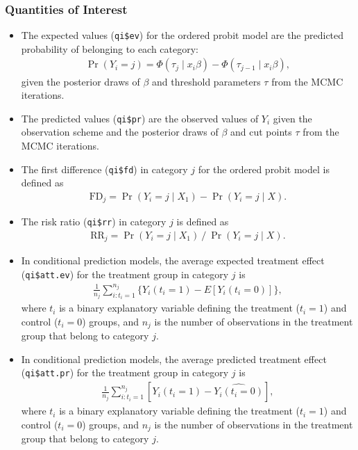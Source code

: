 \subsubsection{Quantities of Interest}

\begin{itemize}
\item The expected values (\texttt{qi\$ev}) for the ordered probit model are
the predicted probability of belonging to each category:
\begin{eqnarray*}
\Pr(Y_i=j)= \Phi(\tau_j \mid x_i \beta)-\Phi(\tau_{j-1} \mid x_i \beta),
\end{eqnarray*}
given the posterior draws of $\beta$ and threshold parameters $\tau$
from the MCMC iterations.

\item The predicted values (\texttt{qi\$pr}) are the observed values of 
$Y_i$ given the observation scheme and the posterior draws of $\beta$
and cut points $\tau$ from the MCMC iterations.

\item The first difference (\texttt{qi\$fd}) in category $j$ for the 
ordered probit model is defined as
\begin{eqnarray*}
\text{FD}_j=\Pr(Y_i=j\mid X_{1})-\Pr(Y_i=j\mid X).
\end{eqnarray*}

\item The risk ratio (\texttt{qi\$rr}) in category $j$ is defined as
\begin{eqnarray*}
\text{RR}_j=\Pr(Y_i=j\mid X_{1})\ /\ \Pr(Y_i=j\mid X).
\end{eqnarray*}


\item In conditional prediction models, the average expected treatment effect
(\texttt{qi\$att.ev}) for the treatment group in category $j$ is
\begin{eqnarray*}
\frac{1}{n_j}\sum_{i:t_{i}=1}^{n_j} \{
Y_{i}(t_{i}=1)-E[Y_{i}(t_{i}=0)] \},
\end{eqnarray*}
where $t_{i}$ is a binary explanatory variable defining the treatment
($t_{i}=1$) and control ($t_{i}=0$) groups, and $n_j$ is the 
number of observations in the treatment group that belong to category $j$.

\item In conditional prediction models, the average predicted treatment effect
(\texttt{qi\$att.pr}) for the treatment group in category $j$ is
\begin{eqnarray*}
\frac{1}{n_j}\sum_{i:t_{i}=1}^{n_j}[Y_{i}(t_{i}=1)-\widehat{Y_{i}(t_{i}=0)}],
\end{eqnarray*}
where $t_{i}$ is a binary explanatory variable defining the treatment
($t_{i}=1$) and control ($t_{i}=0$) groups, and $n_j$ is the 
number of observations in the treatment group that belong to category $j$.
\end{itemize}

